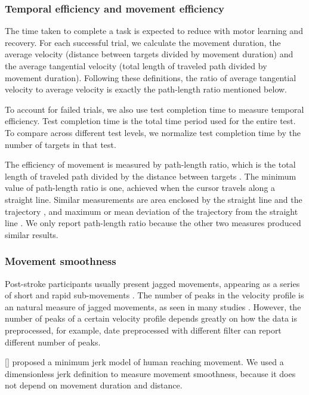 \subsubsection{Temporal efficiency and movement efficiency}
The time taken to complete a task is expected to reduce with motor learning and recovery.
For each successful trial, we calculate the movement duration, the average velocity (distance between targets divided by movement duration) and the average tangential velocity (total length of traveled path divided by movement duration).
Following these definitions, the ratio of average tangential velocity to average velocity is exactly the path-length ratio mentioned below.

To account for failed trials, we also use test completion time to measure temporal efficiency. 
Test completion time is the total time period used for the entire test.
To compare across different test levels, we normalize test completion time by the number of targets in that test.

The efficiency of movement is measured by path-length ratio, which is the total length of traveled path divided by the distance between targets \cite{Cirstea2000}. 
The minimum value of path-length ratio is one, achieved when the cursor travels along a straight line. 
Similar measurements are area enclosed by the straight line and the trajectory \cite{Kim16 from Nordin2014}, and maximum or mean deviation of the trajectory from the straight line \cite{Colombo61 from Nordin2014}. 
We only report path-length ratio because the other two measures produced similar results.

\subsubsection{Movement smoothness}

Post-stroke participants usually present jagged movements, appearing as a series of short and rapid sub-movements \cite{Rohrer1 from Nordin2014}.
The number of peaks in the velocity profile is an natural measure of jagged movements, as seen in many studies \cite{}. 
However, the number of peaks of a certain velocity profile depends greatly on how the data is preprocessed, for example, date preprocessed with different filter can report different number of peaks.

[] proposed a minimum jerk model of human reaching movement.
We used a dimensionless jerk definition \cite{HOgan92 in Nordin2014} to measure movement smoothness, because it does not depend on movement duration and distance.

